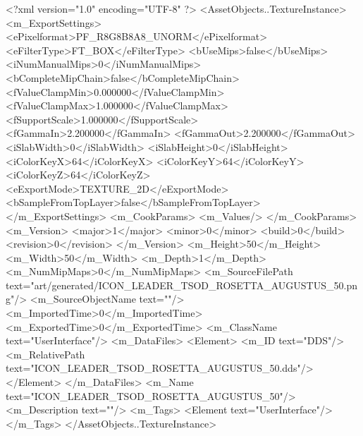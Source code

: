 <?xml version="1.0" encoding="UTF-8" ?>
<AssetObjects..TextureInstance>
	<m_ExportSettings>
		<ePixelformat>PF_R8G8B8A8_UNORM</ePixelformat>
		<eFilterType>FT_BOX</eFilterType>
		<bUseMips>false</bUseMips>
		<iNumManualMips>0</iNumManualMips>
		<bCompleteMipChain>false</bCompleteMipChain>
		<fValueClampMin>0.000000</fValueClampMin>
		<fValueClampMax>1.000000</fValueClampMax>
		<fSupportScale>1.000000</fSupportScale>
		<fGammaIn>2.200000</fGammaIn>
		<fGammaOut>2.200000</fGammaOut>
		<iSlabWidth>0</iSlabWidth>
		<iSlabHeight>0</iSlabHeight>
		<iColorKeyX>64</iColorKeyX>
		<iColorKeyY>64</iColorKeyY>
		<iColorKeyZ>64</iColorKeyZ>
		<eExportMode>TEXTURE_2D</eExportMode>
		<bSampleFromTopLayer>false</bSampleFromTopLayer>
	</m_ExportSettings>
	<m_CookParams>
		<m_Values/>
	</m_CookParams>
	<m_Version>
		<major>1</major>
		<minor>0</minor>
		<build>0</build>
		<revision>0</revision>
	</m_Version>
	<m_Height>50</m_Height>
	<m_Width>50</m_Width>
	<m_Depth>1</m_Depth>
	<m_NumMipMaps>0</m_NumMipMaps>
	<m_SourceFilePath text="art/generated/ICON_LEADER_TSOD_ROSETTA_AUGUSTUS_50.png"/>
	<m_SourceObjectName text=""/>
	<m_ImportedTime>0</m_ImportedTime>
	<m_ExportedTime>0</m_ExportedTime>
	<m_ClassName text="UserInterface"/>
	<m_DataFiles>
		<Element>
			<m_ID text="DDS"/>
			<m_RelativePath text="ICON_LEADER_TSOD_ROSETTA_AUGUSTUS_50.dds"/>
		</Element>
	</m_DataFiles>
	<m_Name text="ICON_LEADER_TSOD_ROSETTA_AUGUSTUS_50"/>
	<m_Description text=""/>
	<m_Tags>
		<Element text="UserInterface"/>
	</m_Tags>
</AssetObjects..TextureInstance>

